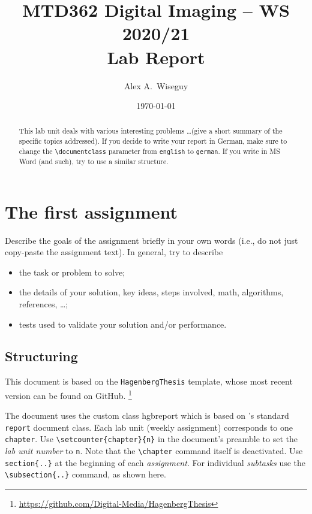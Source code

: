 \documentclass[english,notitlepage,smartquotes]{hgbreport}
\author{Alex A.\ Wiseguy}
\title{MTD362 Digital Imaging -- WS 2020/21\\
				Lab Report \arabic{chapter}}
\date{\today}
\renewcommand{\chapter}[1]{} %
\begin{document}
\maketitle

\begin{abstract}\noindent
This lab unit deals with various interesting problems \ldots (give a short
summary of the specific topics addressed). If you decide to write your report in
German, make sure to change the \verb!\documentclass! parameter from
\texttt{english} to \texttt{german}.
If you write in MS Word (and such), try to use a similar structure.
\end{abstract}


\section{The first assignment}

Describe the goals of the assignment briefly in your own words
(i.e., do not just copy-paste the assignment text).
In general, try to describe
%
\begin{itemize}
	\item the task or problem to solve;
	\item the details of your solution, key ideas, steps involved, math,
	algorithms, references, \ldots;
	\item tests used to validate your solution and/or performance.
\end{itemize}

\subsection{Structuring} %

This \latex document is based on the \texttt{HagenbergThesis} 
template, whose most recent version can be found on GitHub.%
\footnote{\url{https://github.com/Digital-Media/HagenbergThesis}}

The document uses the custom class \textsf{hgbreport} which is based
on \latex's standard \texttt{report} document class. Each lab unit 
(weekly assignment) corresponds to one \texttt{chapter}.
Use \verb!\setcounter{chapter}{n}! in the document's preamble
to set the \emph{lab unit number} to \texttt{n}.
Note that the \verb!\chapter! command itself is deactivated.
Use \verb!section{..}! at the beginning of each \emph{assignment}.
For individual \emph{subtasks} use the 
\verb!\subsection{..}! command, as shown here.
\end{document}
